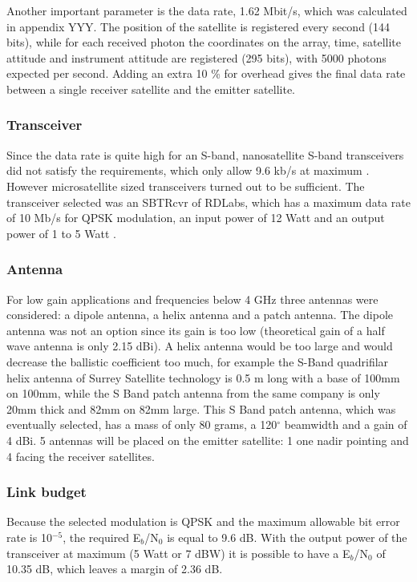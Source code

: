 Another important parameter is the data rate, 1.62 Mbit/s, which was calculated in appendix YYY. The position of the satellite is registered every second (144 bits), while for each received photon the coordinates on the array, time, satellite attitude and instrument attitude are registered (295 bits), with 5000 photons expected per second. Adding an extra 10 \% for overhead gives the final data rate between a single receiver satellite and the emitter satellite.


\subsubsection{Transceiver}
Since the data rate is quite high for an S-band, nanosatellite S-band transceivers did not satisfy the requirements, which only allow 9.6 kb/s at maximum \cite{cubeshopcomm}. However microsatellite sized transceivers turned out to be sufficient. The transceiver selected was an SBTRcvr of RDLabs, which has a maximum data rate of 10 Mb/s for QPSK modulation, an input power of 12 Watt and an output power of 1 to 5 Watt \cite{RDLabs}.

\subsubsection{Antenna}
For low gain applications and frequencies below 4 GHz three antennas were considered: a dipole antenna, a helix antenna and a patch antenna. The dipole antenna was not an option since its gain is too low (theoretical gain of a half wave antenna is only 2.15 dBi). A helix antenna would be too large and would decrease the ballistic coefficient too much, for example the S-Band quadrifilar helix antenna of Surrey Satellite technology \cite{SurrHelix} is 0.5 m long with a base of 100mm on 100mm, while the S Band patch antenna \cite{SurrPatch} from the same company is only 20mm thick and 82mm on 82mm large. 
This S Band patch antenna, which was eventually selected, has a mass of only 80 grams, a 120$^{\circ}$ beamwidth and a gain of 4 dBi.
5 antennas will be placed on the emitter satellite: 1 one nadir pointing and 4 facing the receiver satellites.

\subsubsection{Link budget}
Because the selected modulation is QPSK and the maximum allowable bit error rate is 10$^{-5}$, the required E$_{b}$/N$_{0}$ is equal to 9.6 dB. With the output power of the transceiver at maximum (5 Watt or 7 dBW) it is possible to have a E$_{b}$/N$_{0}$ of 10.35 dB, which leaves a margin of 2.36 dB.

